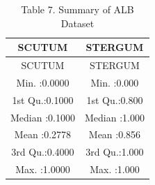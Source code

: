 \begin{longtable}[]{@{}cc@{}}
\caption{Table 7. Summary of ALB Dataset}\tabularnewline
\toprule
\begin{minipage}[b]{0.22\columnwidth}\centering\strut
SCUTUM\strut
\end{minipage} & \begin{minipage}[b]{0.22\columnwidth}\centering\strut
STERGUM\strut
\end{minipage}\tabularnewline
\midrule
\endfirsthead
\toprule
\begin{minipage}[b]{0.22\columnwidth}\centering\strut
SCUTUM\strut
\end{minipage} & \begin{minipage}[b]{0.22\columnwidth}\centering\strut
STERGUM\strut
\end{minipage}\tabularnewline
\midrule
\endhead
\begin{minipage}[t]{0.22\columnwidth}\centering\strut
Min. :0.0000\strut
\end{minipage} & \begin{minipage}[t]{0.22\columnwidth}\centering\strut
Min. :0.000\strut
\end{minipage}\tabularnewline
\begin{minipage}[t]{0.22\columnwidth}\centering\strut
1st Qu.:0.1000\strut
\end{minipage} & \begin{minipage}[t]{0.22\columnwidth}\centering\strut
1st Qu.:0.800\strut
\end{minipage}\tabularnewline
\begin{minipage}[t]{0.22\columnwidth}\centering\strut
Median :0.1000\strut
\end{minipage} & \begin{minipage}[t]{0.22\columnwidth}\centering\strut
Median :1.000\strut
\end{minipage}\tabularnewline
\begin{minipage}[t]{0.22\columnwidth}\centering\strut
Mean :0.2778\strut
\end{minipage} & \begin{minipage}[t]{0.22\columnwidth}\centering\strut
Mean :0.856\strut
\end{minipage}\tabularnewline
\begin{minipage}[t]{0.22\columnwidth}\centering\strut
3rd Qu.:0.4000\strut
\end{minipage} & \begin{minipage}[t]{0.22\columnwidth}\centering\strut
3rd Qu.:1.000\strut
\end{minipage}\tabularnewline
\begin{minipage}[t]{0.22\columnwidth}\centering\strut
Max. :1.0000\strut
\end{minipage} & \begin{minipage}[t]{0.22\columnwidth}\centering\strut
Max. :1.000\strut
\end{minipage}\tabularnewline
\bottomrule
\end{longtable}

